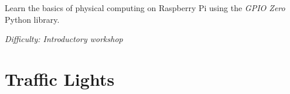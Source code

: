 %
%
%

\newif\ifprint
\printtrue



\newcommand{\workshopTitle}{Workshop 15: GPIO Zero}

\newcommand{\workshopAuthor}{Written by Jack Kelly}



	
	
	Learn the basics of physical computing on Raspberry Pi using the \textit{GPIO Zero} Python library.
	
	\textit{Difficulty: Introductory workshop}
	
	\ifprint
		\renewcommand{\baselinestretch}{0.75}\normalsize
		\tableofcontents
		\renewcommand{\baselinestretch}{1.0}\normalsize
	\else
		\tableofcontents
	\fi
	
	
	
	
	\clearpage
	
	
	\webclearpage
	\section{Traffic Lights}

	\clearpage	
	
	
	\clearpage	
	\begin{appendices}
		
		\webclearpage
		
		
	\end{appendices}

